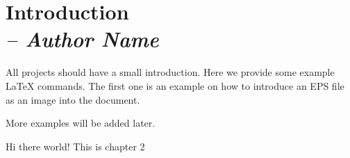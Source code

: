 \chapter{Introduction \\
\small{\textit{-- Author Name}}
\label{Chapter::Introduction}}

All projects should have a small introduction.  Here we provide some
example LaTeX commands.  The first one is an example on how to
introduce an EPS file as an image into the document.


More examples will be added later.

\newpage

Hi there world!
This is chapter 2